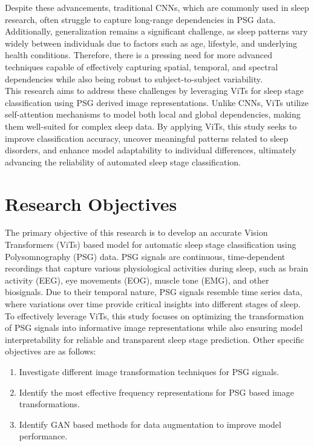 Despite these advancements, traditional \acp{CNN}, which are commonly used in sleep research, often struggle to capture long-range dependencies in \ac{PSG} data. Additionally, generalization remains a significant challenge, as sleep patterns vary widely between individuals due to factors such as age, lifestyle, and underlying health conditions. Therefore, there is a pressing need for more advanced techniques capable of effectively capturing spatial, temporal, and spectral dependencies while also being robust to subject-to-subject variability.\\

This research aims to address these challenges by leveraging \acp{ViT} for sleep stage classification using \ac{PSG} derived image representations. Unlike \acp{CNN}, \acp{ViT} utilize self-attention mechanisms to model both local and global dependencies, making them well-suited for complex sleep data. By applying \acp{ViT}, this study seeks to improve classification accuracy, uncover meaningful patterns related to sleep disorders, and enhance model adaptability to individual differences, ultimately advancing the reliability of automated sleep stage classification.

\section{Research Objectives}
The primary objective of this research is to develop an accurate Vision Transformers (ViTs) based model for automatic sleep stage classification using Polysomnography (PSG) data. PSG signals are continuous, time-dependent recordings that capture various physiological activities during sleep, such as brain activity (EEG), eye movements (EOG), muscle tone (EMG), and other biosignals. Due to their temporal nature, PSG signals resemble time series data, where variations over time provide critical insights into different stages of sleep. To effectively leverage ViTs, this study focuses on optimizing the transformation of PSG signals into informative image representations while also ensuring model interpretability for reliable and transparent sleep stage prediction. Other specific objectives are as follows:
\begin{enumerate}
    \item Investigate different image transformation techniques for \ac{PSG} signals.
    \item Identify the most effective frequency representations for \ac{PSG} based image transformations.
    \item Identify \ac{GAN} based methods for data augmentation to improve model performance.
\end{enumerate}

